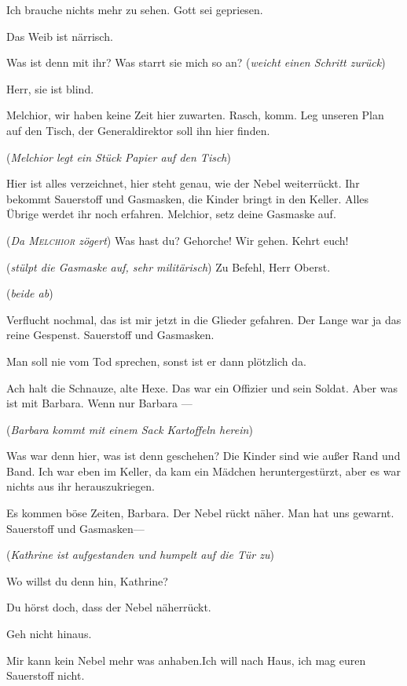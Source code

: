 \documentclass[
	final,
	a4paper,
	ngerman,
	mpinclude = true, %
	twoside = true,
	open = right,
	cleardoublepage = plain,
	DIV = 13,
	BCOR = 1cm,
	titlepage = firstiscover,
	]{scrbook}
\newcommand{\direction}[1]{(\textit{#1})}
\newcommand{\thecharacter}[1]{\textup{\textsc{#1}}\xspace}
\newcommand{\theBarbara}{\thecharacter{Barbara}}
\newcommand{\theJosef}{\thecharacter{Josef}}
\newcommand{\theKathrine}{\thecharacter{Kathrine}}
\newcommand{\theBrix}{\thecharacter{Oberst Brix}}
\newcommand{\theMelchior}{\thecharacter{Melchior}}
\newcommand{\character}[1]{\item[#1]}
\newcommand{\Barbara}{\character{\theBarbara}}
\newcommand{\Josef}{\character{\theJosef}}
\newcommand{\Kathrine}{\character{\theKathrine}}
\newcommand{\Brix}{\character{\theBrix}}
\newcommand{\Melchior}{\character{\theMelchior}}
\begin{document}
\begin{play}
\Kathrine
Ich brauche nichts mehr zu sehen. Gott sei gepriesen.

\Melchior
Das Weib ist närrisch.

\Brix
Was ist denn mit ihr? Was starrt sie mich so an? \direction{weicht einen Schritt zurück}

\Josef
Herr, sie ist blind.

\Brix
Melchior, wir haben keine Zeit hier zuwarten. Rasch, komm. Leg unseren Plan auf den Tisch, der Generaldirektor soll ihn hier finden.

\direction{Melchior legt ein Stück Papier auf den Tisch}

Hier ist alles verzeichnet, hier steht genau, wie der Nebel weiterrückt. Ihr bekommt Sauerstoff und Gasmasken, die Kinder bringt in den Keller. Alles Übrige werdet ihr noch erfahren. Melchior, setz deine Gasmaske auf.

\direction{Da \theMelchior zögert} Was hast du? Gehorche! Wir gehen. Kehrt euch!

\Melchior
\direction{stülpt die Gasmaske auf, sehr militärisch} Zu Befehl, Herr Oberst.

\direction{beide ab}

\Josef
Verflucht nochmal, das ist mir jetzt in die Glieder gefahren. Der Lange war ja das reine Gespenst. Sauerstoff und Gasmasken.

\Kathrine
Man soll nie vom Tod sprechen, sonst ist er dann plötzlich da.

\Josef
Ach halt die Schnauze, alte Hexe. Das war ein Offizier und sein Soldat. Aber was ist mit Barbara. Wenn nur Barbara ---

\direction{Barbara kommt mit einem Sack Kartoffeln herein}

\Barbara
Was war denn hier, was ist denn geschehen? Die Kinder sind wie außer Rand und Band. Ich war eben im Keller, da kam ein Mädchen heruntergestürzt, aber es war nichts aus ihr herauszukriegen.

\Josef
Es kommen böse Zeiten, Barbara. Der Nebel rückt näher. Man hat uns gewarnt. Sauerstoff und Gasmasken---

\direction{Kathrine ist aufgestanden und humpelt auf die Tür zu}

\Barbara
Wo willst du denn hin, Kathrine?

\Josef
Du hörst doch, dass der Nebel näherrückt.

\Barbara
Geh nicht hinaus.

\Kathrine
Mir kann kein Nebel mehr was anhaben.Ich will nach Haus, ich mag euren Sauerstoff nicht.


\end{play}
\end{document}
